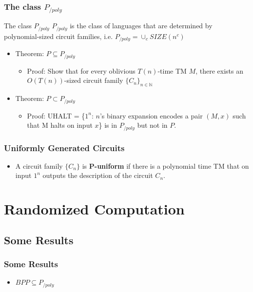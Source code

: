 \documentclass{beamer}
\begin{document}
\begin{frame}

\frametitle{The class $P_{/poly}$}

\begin{block}{The class $P_{/poly}$}
$P_{/poly}$ is the class of languages that are determined by polynomial-sized circuit families, i.e. $P_{/poly} = \cup_{c} SIZE(n^c)$
\end{block}

\begin{itemize}
\item Theorem: $P \subseteq P_{/poly}$
\begin{itemize}
\item  Proof: Show that for every oblivious $T(n)$-time TM $M$, there exists an $O(T(n))$-sized circuit family $\{C_n\}_{n \in \mathbb{N}}$
\end{itemize}
\item Theorem: $P \subset P_{/poly}$
\begin{itemize}
\item  Proof: UHALT = \{$1^n$: $n$'s binary expansion encodes a pair $(M, x)$ such that M halts on input $x$\} is in $P_{/poly}$ but not in $P$.
\end{itemize}
\end{itemize}

\end{frame}

\begin{frame}

\frametitle{Uniformly Generated Circuits}

\begin{itemize}
\item A circuit family $\{C_n\}$ is \textbf{P-uniform} if there is a polynomial time TM that on input $1^n$ outputs the description of the circuit $C_n$.
\end{itemize}

\end{frame}

\section{Randomized Computation}

\subsection{Some Results}

\begin{frame}
\frametitle{Some Results}
\begin{itemize}
\item $BPP \subseteq P_{/poly}$
\end{itemize}
\end{frame}
\end{document}
